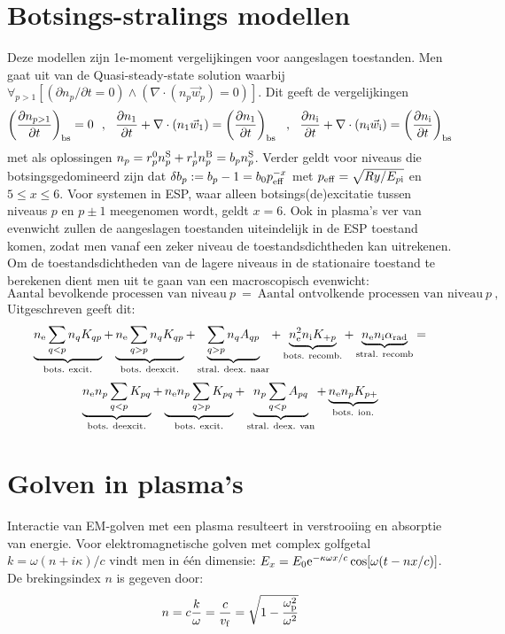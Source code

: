 \section{Botsings-stralings modellen}
Deze modellen zijn 1e-moment vergelijkingen voor aangeslagen toestanden. Men
gaat uit van de Quasi-steady-state solution waarbij
$\forall_{p>1}[(\partial n_p/\partial t=0)\wedge(\nabla\cdot(n_p\vec{w}_p)=0)]$.
Dit geeft de vergelijkingen
\[
\Qc{n_{p>1}}{t}{\rm bs}=0~~,~~
\Q{n_1}{t}+\nabla\cdot(n_1\vec{w}_1)=\Qc{n_1}{t}{\rm bs}~~,~~
\Q{\ni}{t}+\nabla\cdot(\ni\vec{w}_{\rm i})=\Qc{n_{\rm i}}{t}{\rm bs}
\]
met als oplossingen $n_p=r_p^0n_p^{\rm S}+r_p^1n_p^{\rm B}=b_pn_p^{\rm S}$.
Verder geldt voor niveaus die botsingsgedomineerd zijn dat
$\delta b_p:=b_p-1=b_0p_{\rm eff}^{-x}$ met $p_{\rm eff}=\sqrt{Ry/E_{p{\rm i}}}$
en $5\leq x\leq6$. Voor systemen in ESP, waar alleen botsings(de)excitatie
tussen niveaus $p$ en $p\pm1$ meegenomen wordt, geldt $x=6$. Ook in plasma's
ver van evenwicht zullen de aangeslagen toestanden uiteindelijk in de ESP
toestand komen, zodat men vanaf een zeker niveau de toestandsdichtheden kan
uitrekenen.
\npar
Om de toestandsdichtheden van de lagere niveaus in de stationaire toestand te
berekenen dient men uit te gaan van een macroscopisch evenwicht:
\[
\mbox{Aantal bevolkende processen van niveau}~p~=~
\mbox{Aantal ontvolkende processen van niveau}~p~,
\]
Uitgeschreven geeft dit:
\[
\underbrace{\ne\sum_{q<p}n_qK_{qp}}_{\rm bots.~excit.}+
\underbrace{\ne\sum_{q>p}n_qK_{qp}}_{\rm bots.~deexcit.}+
\underbrace{\sum_{q>p}n_qA_{qp}}_{\rm stral.~deex.~naar}+
\underbrace{\ne^2\ni K_{+p}}_{\rm bots.~recomb.}+
\underbrace{\ne\ni\alpha_{\rm rad}}_{\rm stral.~recomb}=
\]
\[
\underbrace{\ne n_p\sum_{q<p}K_{pq}}_{\rm bots.~deexcit.}+
\underbrace{\ne n_p\sum_{q>p}K_{pq}}_{\rm bots.~excit.}+
\underbrace{n_p\sum_{q<p}A_{pq}}_{\rm stral.~deex.~van}+
\underbrace{\ne n_pK_{p+}}_{\rm bots.~ion.}
\]

\section{Golven in plasma's}
Interactie van EM-golven met een plasma resulteert in verstrooiing en
absorptie van energie. Voor elektromagnetische golven met complex golfgetal
$k=\omega(n+i\kappa)/c$ vindt men in \'e\'en dimensie:
$E_x=E_0{\rm e}^{-\kappa\omega x/c}\cos[\omega(t-nx/c)]$. De brekingsindex
$n$ is gegeven door:
\[
n=c\frac{k}{\omega}=\frac{c}{v_{\rm f}}=\sqrt{1-\frac{\omega_{\rm p}^2}{\omega^2}}
\]

